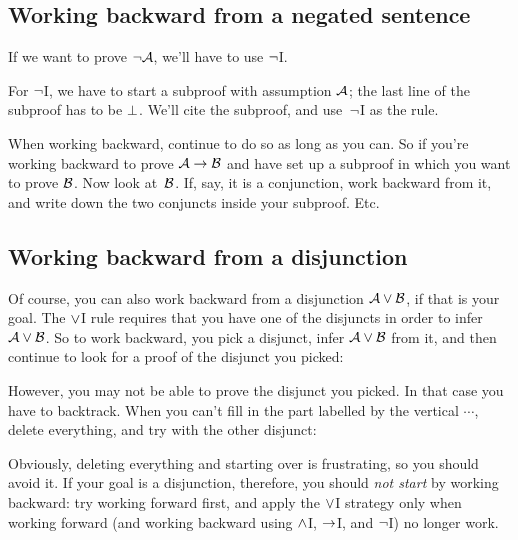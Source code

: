 \subsection*{Working backward from a negated sentence}

If we want to prove $\neg \mathcal{A}$, we'll have to use $\neg$I.
\begin{fitchproof}
\open
{}
\ellipsesline 
{}
\close
{}
\end{fitchproof} 
For $\neg$I, we have to start a subproof with assumption $\mathcal{A}$; the last line of the subproof has to be $\bot$.  We'll cite the subproof, and use~$\neg$I as the rule.

When working backward, continue to do so as long as you can. So if you're working backward to prove $\mathcal{A} \rightarrow \mathcal{B}$ and have set up a subproof in which you want to prove $\mathcal{B}$. Now look at~$\mathcal{B}$. If, say, it is a conjunction, work backward from it, and write down the two conjuncts inside your subproof. Etc.

\subsection*{Working backward from a disjunction}

Of course, you can also work backward from a disjunction $\mathcal{A} \vee \mathcal{B}$, if that is your goal.
The $\vee$I rule requires that you have one of the disjuncts in order to infer $\mathcal{A} \vee \mathcal{B}$.
So to work backward, you pick a disjunct, infer $\mathcal{A} \vee \mathcal{B}$ from it, and then continue to look for a proof of the disjunct you picked:
\begin{fitchproof}
	\ellipsesline
\end{fitchproof}
However, you may not be able to prove the disjunct you picked. In that
case you have to backtrack. When you can't fill in the part labelled
by the vertical $\cdots$,
delete everything, and try with the other disjunct:
\begin{fitchproof}
	\ellipsesline 
\end{fitchproof}
Obviously, deleting everything and starting over is frustrating, so you should avoid it. If your goal is a disjunction, therefore, you should \emph{not start} by working backward: try working forward first, and apply the $\vee$I strategy only when working forward (and working backward using $\wedge$I, $\rightarrow$I, and $\neg$I) no longer work.

